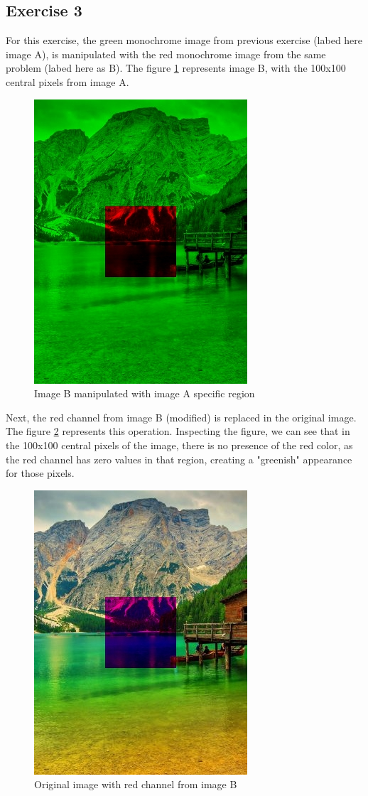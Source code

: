 \documentclass[]{IEEEtran}
\begin{document}
  \subsection{Exercise 3}
  For this exercise, the green monochrome image from previous exercise (labed here image A), is manipulated with the red monochrome image from the same problem (labed here as B). The figure \ref{fig:o-3-0} represents image B, with the 100x100 central pixels from image A.  
  \begin{figure}[!h]
    \centering
    \includegraphics{../output/o-3-0.jpg}
    \caption{Image B manipulated with image A specific region}
    \label{fig:o-3-0}
  \end{figure}
  Next, the red channel from image B (modified) is replaced in the original image. The figure \ref{fig:o-3-1} represents this operation. Inspecting the figure, we can see that in the 100x100 central pixels of the image, there is no presence of the red color, as the red channel has zero values in that region, creating a "greenish" appearance for those pixels. 
  
  \begin{figure}[!h]
    \centering
    \includegraphics{../output/o-3-1.jpg}
    \caption{Original image with red channel from image B}
    \label{fig:o-3-1}
  \end{figure}
\end{document}
